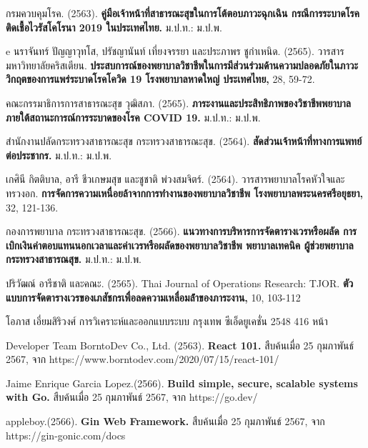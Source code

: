 
\begin{thebibliography}{99}

    กรมควบคุมโรค. (2563). \textbf{คู่มือเจ้าหน้าที่สาธารณะสุขในการโต้ตอบภาวะฉุกเฉิน กรณีการระบาดโรคติดเชื้อไวรัสโคโรนา 2019 ในประเทศไทย.} ม.ป.ท.: ม.ป.พ.

    e
    นราจันทร์ ปัญญาวุทโส, ปรัชญานันท์ เที่ยงจรรยา และประภาพร ชูกำเหนิด. (2565). วารสารมหาวิทยาลัยคริสเตียน. \textbf{ประสบการณ์ของพยาบาลวิชาชีพในการมีส่วนร่วมด้านความปลอดภัยในภาวะวิกฤตของการแพร่ระบาดโรคโควิด 19 โรงพยาบาลหาดใหญ่ ประเทศไทย,} 28, 59-72.

    คณะกรรมาธิการการสาธารณะสุข วุฒิสภา. (2565). \textbf{ภาระงานและประสิทธิภาพของวิชาชีพพยาบาล ภายใต้สถานะการณ์การระบาดของโรค COVID 19.} ม.ป.ท.: ม.ป.พ.

    สำนักงานปลัดกระทรวงสาธารณะสุข กระทรวงสาธารณะสุข. (2564). \textbf{สัดส่วนเจ้าหน้าที่ทางการแพทย์ต่อประชากร.} ม.ป.ท.: ม.ป.พ.

    เกศินี กิตติบาล, อารี ชีวเกษมสุข และชูชาติ พ่วงสมจิตร์. (2564). วารสารพยาบาลโรคหัวใจและทรวงอก. \textbf{การจัดการความเหนื่อยล้าจากการทํางานของพยาบาลวิชาชีพ โรงพยาบาลพระนครศรีอยุธยา,} 32, 121-136.

    กองการพยาบาล กระทรวงสาธารณะสุข. (2566). \textbf{แนวทางการบริหารการจัดตารางเวรหรือผลัด การเบิกเงินค่าตอบแทนนอกเวลาและค่าเวรหรือผลัดของพยาบาลวิชาชีพ พยาบาลเทคนิค ผู้ช่วยพยาบาล กระทรวงสาธารณสุข.} ม.ป.ท.: ม.ป.พ.

    ปริวัฒณ์ อารีชาติ และคณะ. (2565). Thai Journal of Operations Research: TJOR. \textbf{ตัวแบบการจัดตารางเวรของเภสัชกรเพื่อลดความเหลื่อมล้ําของภาระงาน,} 10, 103-112


    โอภาส เอี่ยมสิริวงศ์ การวิเคราะห์และออกแบบระบบ กรุงเทพ ซีเอ็ดยูเคชั่น 2548 416 หน้า
    

Developer Team BorntoDev Co., Ltd. (2563). \textbf{React 101.} สืบค้นเมื่อ 25 กุมภาพันธ์ 2567, จาก https://www.borntodev.com/2020/07/15/react-101/

Jaime Enrique Garcia Lopez.(2566). \textbf{Build simple, secure, scalable systems with Go.} สืบค้นเมื่อ 25 กุมภาพันธ์ 2567, จาก https://go.dev/



appleboy.(2566). \textbf{Gin Web Framework.} สืบค้นเมื่อ 25 กุมภาพันธ์ 2567, จาก https://gin-gonic.com/docs


\end{thebibliography}
